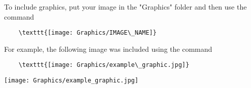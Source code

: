 
\question To include graphics, put your image in the "Graphics" folder and then use the command
\begin{verbatim}
    \texttt{[image: Graphics/IMAGE\_NAME]}
\end{verbatim}
For example, the following image was included using the command
\begin{verbatim}
    \texttt{[image: Graphics/example\_graphic.jpg]}
\end{verbatim}
\begin{center}
    \texttt{[image: Graphics/example\_graphic.jpg]}
\end{center}



